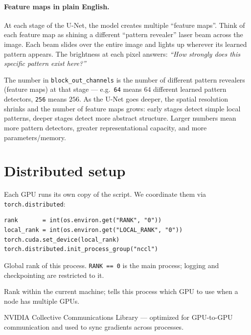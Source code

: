 \documentclass[11pt]{article}
\newcommand{\code}[1]{\texttt{#1}}
\begin{document}
\paragraph{Feature maps in plain English.} At each stage of the U-Net, the
model creates multiple ``feature maps''. Think of each feature map as shining
a different ``pattern revealer'' laser beam across the image. Each beam slides
over the entire image and lights up wherever its learned pattern appears.
The brightness at each pixel answers: \emph{``How strongly does this specific
pattern exist here?''}

The number in \code{block\_out\_channels} is the number of different pattern
revealers (feature maps) at that stage --- e.g.\ \code{64} means $64$ different
learned pattern detectors, \code{256} means $256$. As the U-Net goes deeper,
the spatial resolution shrinks and the number of feature maps grows: early
stages detect simple local patterns, deeper stages detect more abstract
structure. Larger numbers mean more pattern detectors, greater representational
capacity, and more parameters/memory.

\section{Distributed setup}

Each GPU runs its own copy of the script. We coordinate them via
\code{torch.distributed}:

\begin{lstlisting}
rank       = int(os.environ.get("RANK", "0"))
local_rank = int(os.environ.get("LOCAL_RANK", "0"))
torch.cuda.set_device(local_rank)
torch.distributed.init_process_group("nccl")
\end{lstlisting}

\begin{description}[style=nextline,leftmargin=1.5em]
  \item[\code{RANK}] Global rank of this process. \code{RANK == 0} is the
    main process; logging and checkpointing are restricted to it.
  \item[\code{LOCAL\_RANK}] Rank within the current machine; tells this
    process which GPU to use when a node has multiple GPUs.
  \item[\code{nccl}] NVIDIA Collective Communications Library --- optimized
    for GPU-to-GPU communication and used to sync gradients across processes.
\end{description}
\end{document}
